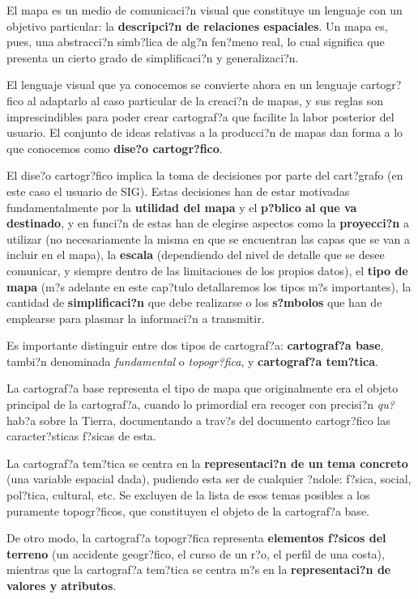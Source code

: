 El mapa es un medio de comunicaci?n visual que constituye un lenguaje con un objetivo particular: la \textbf{descripci?n de relaciones espaciales}. Un mapa es, pues, una abstracci?n simb?lica de alg?n fen?meno real, lo cual significa que presenta un cierto grado de simplificaci?n y generalizaci?n.

El lenguaje visual que ya conocemos se convierte ahora en un lenguaje cartogr?fico al adaptarlo al caso particular de la creaci?n de mapas, y sus reglas son imprescindibles para poder crear cartograf?a que facilite la labor posterior del usuario. El conjunto de ideas relativas a la producci?n de mapas dan forma a lo que conocemos como \textbf{dise?o cartogr?fico}.

El dise?o cartogr?fico implica la toma de decisiones por parte del cart?grafo (en este caso el usuario de SIG). Estas decisiones han de estar motivadas fundamentalmente por la \textbf{utilidad del mapa} y el \textbf{p?blico al que va destinado}, y en funci?n de estas han de elegirse aspectos como la \textbf{proyecci?n} a utilizar (no necesariamente la misma en que se encuentran las capas que se van a incluir en el mapa), la \textbf{escala} (dependiendo del nivel de detalle que se desee comunicar, y siempre dentro de las limitaciones de los propios datos), el \textbf{tipo de mapa} (m?s adelante en este cap?tulo detallaremos los tipos m?s importantes), la cantidad de \textbf{simplificaci?n} que debe realizarse o los \textbf{s?mbolos} que han de emplearse para plasmar la informaci?n a transmitir.


Es importante distinguir entre dos tipos de cartograf?a: \textbf{cartograf?a base}, tambi?n denominada \emph{fundamental} o \emph{topogr?fica}, y \textbf{cartograf?a tem?tica}.

La cartograf?a base representa el tipo de mapa que originalmente era el objeto principal de la cartograf?a, cuando lo primordial era recoger con precisi?n \emph{qu?} hab?a sobre la Tierra, documentando a trav?s del documento cartogr?fico las caracter?sticas f?sicas de esta. 

La cartograf?a tem?tica se centra en la \textbf{representaci?n de un tema concreto} (una variable espacial dada), pudiendo esta ser de cualquier ?ndole: f?sica, social, pol?tica, cultural, etc. Se excluyen de la lista de esos temas posibles a los puramente topogr?ficos, que constituyen el objeto de la cartograf?a base.

De otro modo, la cartograf?a topogr?fica representa \textbf{elementos f?sicos del terreno} (un accidente geogr?fico, el curso de un r?o, el perfil de una costa), mientras que la cartograf?a tem?tica se centra m?s en la \textbf{representaci?n de valores y atributos}.

